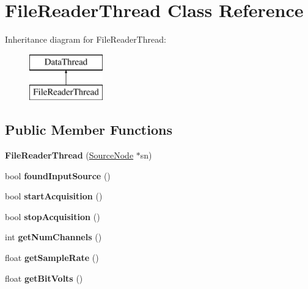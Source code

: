 \hypertarget{classFileReaderThread}{\section{File\-Reader\-Thread Class Reference}
\label{classFileReaderThread}
}
Inheritance diagram for File\-Reader\-Thread\-:\begin{figure}[H]
\begin{center}
\leavevmode
\includegraphics[height=2.000000cm]{classFileReaderThread}
\end{center}
\end{figure}
\subsection*{Public Member Functions}
\begin{DoxyCompactItemize}
\item 
\hypertarget{classFileReaderThread_a9cc610d29b3497c07353551bbec201f2}{{\bfseries File\-Reader\-Thread} (\hyperlink{classSourceNode}{Source\-Node} $\ast$sn)}\label{classFileReaderThread_a9cc610d29b3497c07353551bbec201f2}

\item 
\hypertarget{classFileReaderThread_ae1e58d2033c87cd71cff4d2e45360087}{bool {\bfseries found\-Input\-Source} ()}\label{classFileReaderThread_ae1e58d2033c87cd71cff4d2e45360087}

\item 
\hypertarget{classFileReaderThread_a4d5c3434d7b635d25bbc4c2014b95a61}{bool {\bfseries start\-Acquisition} ()}\label{classFileReaderThread_a4d5c3434d7b635d25bbc4c2014b95a61}

\item 
\hypertarget{classFileReaderThread_ad2abbe666106abe215753a9b3ff328d4}{bool {\bfseries stop\-Acquisition} ()}\label{classFileReaderThread_ad2abbe666106abe215753a9b3ff328d4}

\item 
\hypertarget{classFileReaderThread_aea6f87741b16e78b29f32b2efccf5664}{int {\bfseries get\-Num\-Channels} ()}\label{classFileReaderThread_aea6f87741b16e78b29f32b2efccf5664}

\item 
\hypertarget{classFileReaderThread_ab6360a15dd538bb78dfd3c52fa6fa1d2}{float {\bfseries get\-Sample\-Rate} ()}\label{classFileReaderThread_ab6360a15dd538bb78dfd3c52fa6fa1d2}

\item 
\hypertarget{classFileReaderThread_a50b11fd1f129af9488134d1b6e31e93b}{float {\bfseries get\-Bit\-Volts} ()}\label{classFileReaderThread_a50b11fd1f129af9488134d1b6e31e93b}

\end{DoxyCompactItemize}
